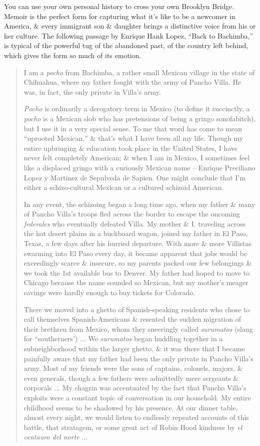\documentclass{article}
\begin{document}
You can use your own personal history to cross your own Brooklyn Bridge. Memoir is the perfect form for capturing what it's like to be a newcomer in America, \& every immigrant son \& daughter brings a distinctive voice from his or her culture. The following passage by Enrique Hank Lopez, ``Back to Bachimba,'' is typical of the powerful tug of the abandoned past, of the country left behind, which gives the form so much of its emotion.
\begin{quotation}
	I am a \textit{pocho} from Bachimba, a rather small Mexican village in the state of Chihuahua, where my father fought with the army of Pancho Villa. He was, in fact, the only private in Villa's army.
	
	\textit{Pocho} is ordinarily a derogatory term in Mexico (to define it succinctly, a \textit{pocho} is a Mexican slob who has pretensions of being a gringo sonofabitch), but I use it in a very special sense. To me that word has come to mean ``uprooted Mexican,'' \& that's what I have been all my life. Though my entire upbringing \& education took place in the United States, I have never felt completely American; \& when I am in Mexico, I sometimes feel like a displaced gringo with a curiously Mexican name -- Enrique Preciliano Lopez y Martinez de Sepulveda de Sapien. One might conclude that I'm either a schizo-cultural Mexican or a cultured schizoid American.
	
	In any event, the schizoing began a long time ago, when my father \& many of Pancho Villa's troops fled across the border to escape the oncoming \textit{federales} who eventually defeated Villa. My mother \& I, traveling across the hot desert plains in a buckboard wagon, joined my father in El Paso, Texas, a few days after his hurried departure. With more \& more Villistas swarming into El Paso every day, it became apparent that jobs would be exceedingly scarce \& insecure, so my parents packed our few belongings \& we took the 1st available bus to Denver. My father had hoped to move to Chicago because the name sounded so Mexican, but my mother's meager savings were hardly enough to buy tickets for Colorado.
	
	There we moved into a ghetto of Spanish-speaking residents who chose to call themselves Spanish-Americans \& resented the sudden migration of their brethren from Mexico, whom they sneeringly called \textit{surumatos} (slang for ``southerners') $\ldots$ We \textit{surumatos} began huddling together in a subneighborhood within the larger ghetto, \& it was there that I became painfully aware that my father had been the only private in Pancho Villa's army. Most of my friends were the sons of captains, colonels, majors, \& even generals, though a few fathers were admittedly mere sergeants \& corporals $\ldots$ My chagrin was accentuated by the fact that Pancho Villa's exploits were a constant topic of conversation in our household. My entire childhood seems to be shadowed by his presence. At our dinner table, almost every night, we would listen to endlessly repeated accounts of this battle, that stratagem, or some great act of Robin Hood kindness by \textit{el centauro del norte} $\ldots$
	

\end{quotation}
\end{document}

